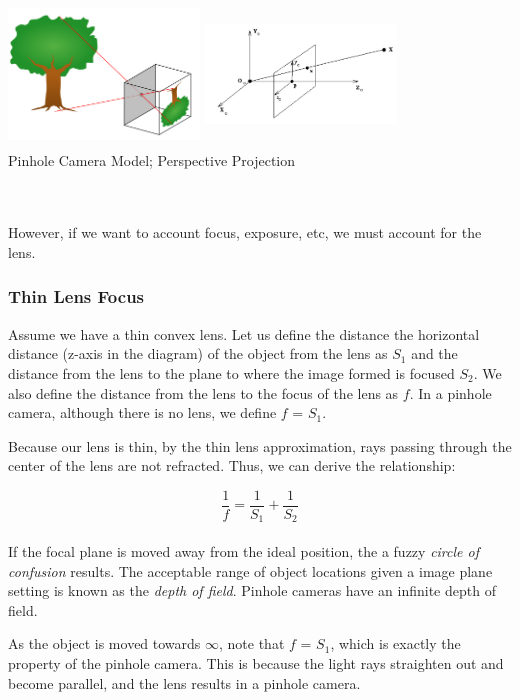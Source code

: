 \documentclass{article}
\begin{document}
\begin{center}
    \includegraphics[height=1.5in, width=2in]{L1F6}
    \includegraphics[height=1.5in, width=2in]{L1F5} \\
    \caption{Pinhole Camera Model; Perspective Projection}
\end{center}
\\ \\ 
However, if we want to account focus, exposure, etc, we must account for the lens.

\subsubsection{Thin Lens Focus}
Assume we have a thin convex lens. Let us define the distance the horizontal distance (z-axis in the diagram) of the object from the lens as $S_1$ and the distance from the lens to the plane to where the image formed is focused $S_2$. We also define the distance from the lens to the focus of the lens as $f$. In a pinhole camera, although there is no lens, we define $f$ = $S_1$.

Because our lens is thin, by the thin lens approximation, rays passing through the center of the lens are not refracted. Thus, we can derive the relationship:

$$ \frac{1}{f} = \frac{1}{S_1} + \frac{1}{S_2}$$ \\
\noindent
If the focal plane is moved away from the ideal position, the a fuzzy \textit{circle of confusion} results. The acceptable range of object locations given a image plane setting is known as the \textit{depth of field}. Pinhole cameras have an infinite depth of field.

As the object is moved towards $\infty$, note that $f$ = $S_1$, which is exactly the property of the pinhole camera. This is because the light rays straighten out and become parallel, and the lens results in a pinhole camera.
\end{document}
